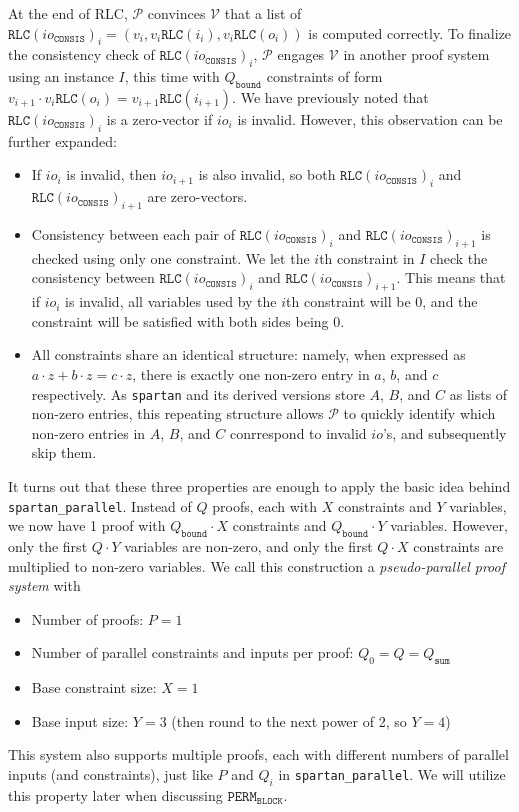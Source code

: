\documentclass{article}
\newcommand{\code}{\texttt}
\newcommand{\Qbound}{Q_{\mathtt{bound}}}
\newcommand{\Qsum}{Q_{\mathtt{sum}}}
\renewcommand{\P}{\mathcal{P}}
\newcommand{\V}{\mathcal{V}}
\newcommand{\RLC}{\mathtt{RLC}}
\newcommand{\ioc}{io_{\mathtt{CONSIS}}}
\newcommand{\PERMB}{\mathtt{PERM_{BLOCK}}}
\begin{document}
At the end of RLC, $\P$ convinces $\V$ that a list of $\RLC(\ioc)_i = (v_i, v_i\RLC(i_i), v_i\RLC(o_i))$ is computed correctly. To finalize the consistency check of $\RLC(\ioc)_i$, $\P$ engages $\V$ in another proof system using an instance $I$, this time with $\Qbound$ constraints of form $v_{i+1}\cdot v_i\RLC(o_i) = v_{i+1}\RLC(i_{i+1})$. We have previously noted that $\RLC(\ioc)_i$ is a zero-vector if $io_i$ is invalid. However, this observation can be further expanded:
\begin{itemize}
    \item If $io_i$ is invalid, then $io_{i+1}$ is also invalid, so both $\RLC(\ioc)_i$ and $\RLC(\ioc)_{i+1}$ are zero-vectors.
    \item Consistency between each pair of $\RLC(\ioc)_i$ and $\RLC(\ioc)_{i+1}$ is checked using only one constraint. We let the $i$th constraint in $I$ check the consistency between $\RLC(\ioc)_i$ and $\RLC(\ioc)_{i+1}$. This means that if $io_i$ is invalid, all variables used by the $i$th constraint will be 0, and the constraint will be satisfied with both sides being 0.
    \item All constraints share an identical structure: namely, when expressed as $a\cdot z + b\cdot z = c\cdot z$, there is exactly one non-zero entry in $a$, $b$, and $c$ respectively. As \code{spartan} and its derived versions store $A$, $B$, and $C$ as lists of non-zero entries, this repeating structure allows $\P$ to quickly identify which non-zero entries in $A$, $B$, and $C$ conrrespond to invalid $io$'s, and subsequently skip them.
\end{itemize}
It turns out that these three properties are enough to apply the basic idea behind \code{spartan\_parallel}. Instead of $Q$ proofs, each with $X$ constraints and $Y$ variables, we now have 1 proof with $\Qbound\cdot X$ constraints and $\Qbound\cdot Y$ variables. However, only the first $Q\cdot Y$ variables are non-zero, and only the first $Q\cdot X$ constraints are multiplied to non-zero variables. We call this construction a \emph{pseudo-parallel proof system} with
\begin{itemize}
    \item Number of proofs: $P = 1$
    \item Number of parallel constraints and inputs per proof: $Q_0 = Q = \Qsum$
    \item Base constraint size: $X = 1$
    \item Base input size: $Y = 3$ (then round to the next power of 2, so $Y = 4$)
\end{itemize}
This system also supports multiple proofs, each with different numbers of parallel inputs (and constraints), just like $P$ and $Q_i$ in \code{spartan\_parallel}. We will utilize this property later when discussing $\PERMB$.
\end{document}
